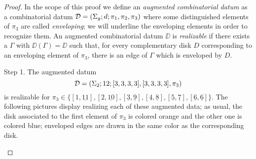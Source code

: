 \begin{proof}
\def\env#1{\underline{#1}}
In the scope of this proof we define an \emph{augmented combinatorial datum} as a combinatorial datum $\mathcal{D}=(\Sigma_{g};d;\pi_1,\pi_2,\pi_3)$ where some distinguished elements of $\pi_3$ are called \emph{enveloping}; we will underline the enveloping elements in order to recognize them. An augmented combinatorial datum $\DD$ is \emph{realizable} if there exists a \dessin{} $\Gamma$ with $\DD(\Gamma)=\DD$ such that, for every complementary disk $D$ corresponding to an enveloping element of $\pi_3$, there is an edge of $\Gamma$ which is enveloped by $D$.
\begin{sideline}{Step 1.}
The augmented datum
\[
\mathcal{D}=(\Sigma_{2};12;[3,3,3,3],[3,3,3,3],\pi_3)
\]
is realizable for $\pi_3\in\{[1,\env{11}],[2,\env{10}],[\env{3},\env{9}],[\env{4},\env{8}],[\env{5},\env{7}],[\env{6},\env{6}]\}$. The following pictures display \dessins{} realizing each of these augmented data; as usual, the disk associated to the first element of $\pi_3$ is colored orange and the other one is colored blue; enveloped edges are drawn in the same color as the corresponding disk.

\bgroup

\smallvertices{}
\def\myradius{1.33}
\def\draweightvertices{
\path[use as bounding box] (-1.8,-1.5) rectangle (1.8,2);
\path (0:\myradius) coordinate (w1) pic{white vertex};
\path (90:\myradius) coordinate (w2) pic{white vertex};
\path (180:\myradius) coordinate (w3) pic{white vertex};
\path (270:\myradius) coordinate (w4) pic{white vertex};
\path (45:\myradius) coordinate (b1) pic{black vertex};
\path (135:\myradius) coordinate (b2) pic{black vertex};
\path (225:\myradius) coordinate (b3) pic{black vertex};
\path (315:\myradius) coordinate (b4) pic{black vertex};
}


\end{sideline}
\end{proof}
